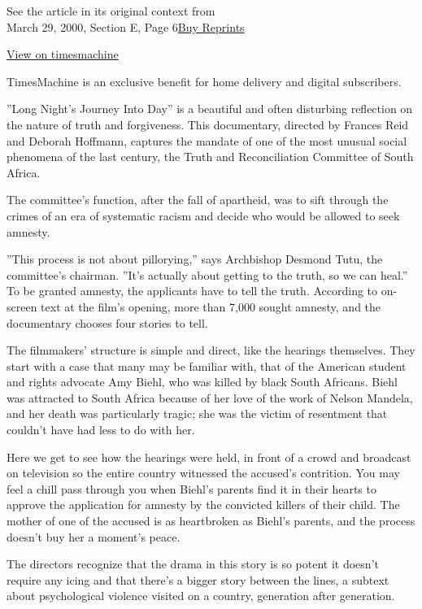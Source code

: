 See the article in its original context from\\
March 29, 2000, Section E, Page
6\href{https://store.nytimes3xbfgragh.onion/collections/new-york-times-page-reprints?utm_source=nytimes\&utm_medium=article-page\&utm_campaign=reprints}{Buy
Reprints}

\href{http://timesmachine.nytimes3xbfgragh.onion/timesmachine/2000/03/29/502812.html}{View
on timesmachine}

TimesMachine is an exclusive benefit for home delivery and digital
subscribers.

''Long Night's Journey Into Day'' is a beautiful and often disturbing
reflection on the nature of truth and forgiveness. This documentary,
directed by Frances Reid and Deborah Hoffmann, captures the mandate of
one of the most unusual social phenomena of the last century, the Truth
and Reconciliation Committee of South Africa.

The committee's function, after the fall of apartheid, was to sift
through the crimes of an era of systematic racism and decide who would
be allowed to seek amnesty.

''This process is not about pillorying,'' says Archbishop Desmond Tutu,
the committee's chairman. ''It's actually about getting to the truth, so
we can heal.'' To be granted amnesty, the applicants have to tell the
truth. According to on-screen text at the film's opening, more than
7,000 sought amnesty, and the documentary chooses four stories to tell.

The filmmakers' structure is simple and direct, like the hearings
themselves. They start with a case that many may be familiar with, that
of the American student and rights advocate Amy Biehl, who was killed by
black South Africans. Biehl was attracted to South Africa because of her
love of the work of Nelson Mandela, and her death was particularly
tragic; she was the victim of resentment that couldn't have had less to
do with her.

Here we get to see how the hearings were held, in front of a crowd and
broadcast on television so the entire country witnessed the accused's
contrition. You may feel a chill pass through you when Biehl's parents
find it in their hearts to approve the application for amnesty by the
convicted killers of their child. The mother of one of the accused is as
heartbroken as Biehl's parents, and the process doesn't buy her a
moment's peace.

The directors recognize that the drama in this story is so potent it
doesn't require any icing and that there's a bigger story between the
lines, a subtext about psychological violence visited on a country,
generation after generation.


